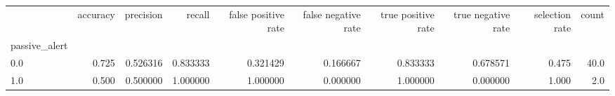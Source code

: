 \begin{tabular}{lrrrrrrrrr}
\toprule
{} &  accuracy &  precision &    recall &  false positive rate &  false negative rate &  true positive rate &  true negative rate &  selection rate &  count \\
passive\_alert &           &            &           &                      &                      &                     &                     &                 &        \\
\midrule
0.0           &     0.725 &   0.526316 &  0.833333 &             0.321429 &             0.166667 &            0.833333 &            0.678571 &           0.475 &   40.0 \\
1.0           &     0.500 &   0.500000 &  1.000000 &             1.000000 &             0.000000 &            1.000000 &            0.000000 &           1.000 &    2.0 \\
\bottomrule
\end{tabular}
